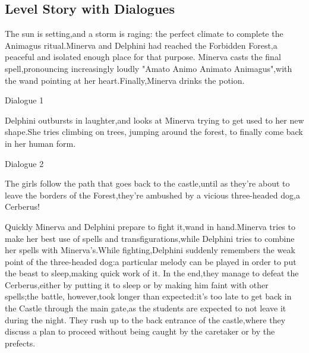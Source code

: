 \subsection{Level Story with Dialogues}

The sun is setting,and a storm is raging: the perfect climate to complete the Animagus ritual.Minerva and Delphini had reached the Forbidden Forest,a peaceful and isolated enough place for that purpose. Minerva casts the final spell,pronouncing increasingly loudly "Amato Animo Animato Animagus",with the wand pointing at her heart.Finally,Minerva drinks the potion.


\begin{dialogue}{Dialogue 1}
\end{dialogue} 

Delphini outbursts in laughter,and looks at Minerva trying to get used to her new shape.She tries climbing on trees, jumping around the forest, to finally come back in her human form.

\pagebreak

\begin{dialogue}{Dialogue 2}
\end{dialogue} 

The girls follow the path that goes back to the castle,until as they're about to leave the borders of the Forest,they're ambushed by a vicious three-headed dog,a Cerberus!


Quickly Minerva and Delphini prepare to fight it,wand in hand.Minerva tries to make her best use of spells and transfigurations,while Delphini tries to combine her spells with Minerva's.While fighting,Delphini suddenly remembers the weak point of the three-headed dog:a particular melody can be played in order to put the beast to sleep,making quick work of it. In the end,they manage to defeat the Cerberus,either by putting it to sleep or by making him faint with other spells;the battle, however,took longer than expected:it's too late to get back in the Castle through the main gate,as the students are expected to not leave it during the night. They rush up to the back entrance of the castle,where they discuss a plan to proceed without being caught by the caretaker or by the prefects.
  
